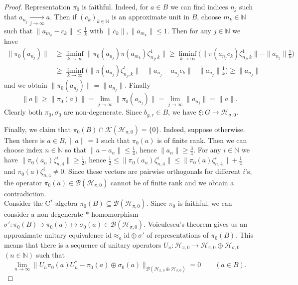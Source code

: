 \documentclass[12pt]{amsart}
\theoremstyle{definition}
\theoremstyle{remark}
\numberwithin{equation}{section}
\newcommand{\N}{\mathbb{N}}
\newcommand{\mc}{\mathcal}
\begin{document}
\begin{proof}
Representation $\pi_0$ is faithful. Indeed, for $a\in B$ we can find indices $n_j$ such that $a_{n_j}\xrightarrow[j\to\infty]{} a$. Then if $(c_k)_{k\in\N}$ is an approximate unit in $B$, choose $m_k\in\N$ such that $\|a_{m_k} - c_k\|\le\tfrac{1}{k}$ with $\|c_k\|,\|a_{m_k}\|\le 1$. Then for any $j\in \N$ we have
\begin{align*}
 \|\pi_0(a_{n_j})\|&\ge \liminf_{k\to\infty}
 \|\pi_0(a_{n_j}) \pi(a_{m_k})\zeta^1_{n_j,k}\|\ge
 \liminf_{k\to\infty} \bigl(
  \|\pi(a_{n_j} c_k)\zeta^1_{n_j,k}\|-\|a_{n_j}\|\tfrac{1}{k}
  \bigr)\\
  &\ge
   \liminf_{k\to\infty} \bigl(
  \|\pi(a_{n_j} )\zeta^1_{n_j,k}\|-
\|a_{n_j}-a_{n_j}c_k\|-
  \|a_{n_j}\|\tfrac{1}{k}
  \bigr) \ge \|a_{n_j}\|
\end{align*}
 and we obtain $\|\pi_0(a_{n_j})\|=\|a_{n_j}\|$. Finally
\[
\|a\|\ge \|\pi_0(a)\|=
\lim_{j\to\infty} \|\pi_0(a_{n_j})\|
=\lim_{j\to\infty} \|a_{n_j}\|=\|a\|.
\]
Clearly both $\pi_0,\sigma_0$ are non-degenerate. Since $b_{g,r}\in B$, we have $\xi\colon G\rightarrow \mc{H}_{\sigma,0}$.

Finally, we claim that $\pi_0(B)\cap \mc{K}(\mc{H}_{\pi,0})=\{0\}$. Indeed, suppose otherwise. Then there is $a\in B, \|a\|=1$ such that $\pi_0(a)$ is of finite rank. Then we can choose index $n\in \N$ so that $\|a-a_n\|\le \tfrac{1}{4}$, hence $\|a_n\|\ge \tfrac{3}{4}$. For any $i\in \N$ we have $\|\pi_0(a_n)\zeta^{i}_{n,4}\| \ge  \tfrac{1}{2}$, hence $\tfrac{1}{2} \le \|\pi_0(a_n)\zeta^{i}_{n,4}\| \le \|\pi_0(a)\zeta^i_{n,4}\|+ \tfrac{1}{4}$ and $\pi_0(a)\zeta^{i}_{n,4}\neq 0$. Since these vectors are pairwise orthogonals for different $i$'s, the operator $\pi_0(a)\in \mc{B}(\mc{H}_{\pi,0})$ cannot be of finite rank and we obtain a contradiction.\\



Consider the C$^*$-algebra $\pi_0(B)\subseteq \mc{B}(\mc{H}_{\pi,0})$. Since $\pi_0$ is faithful, we can consider a non-degenerate $*$-homomorphism $\sigma'\colon \pi_0(B)\ni \pi_0(a)\mapsto \sigma_0(a)\in \mc{B}(\mc{H}_{\sigma,0})$. Voiculescu's theorem \cite[Corollary II.5.5]{Davidson} gives us an approximate unitary equivalence $\mathrm{id}\approx_a \mathrm{id} \oplus \sigma'$ of representations of $\pi_0(B)$. This means that there is a sequence of unitary operators $U_n\colon \mc{H}_{\pi,0}\rightarrow \mc{H}_{\pi,0}\oplus \mc{H}_{\sigma,0}$ $(n\in\N)$ such that
\[
\lim_{n\to\infty} \| U_n \pi_0(a) U_n^* - \pi_0(a)\oplus \sigma_0(a)\|_{\mc{B}(\mc{H}_{\pi,0}\oplus\mc{H}_{\sigma,0})}=0\qquad(a\in B).
\]


\end{proof}
\end{document}
